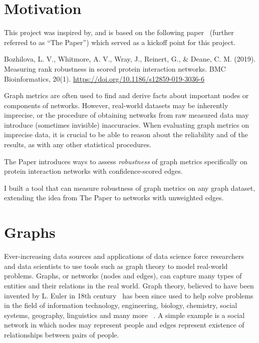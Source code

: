 \section{Motivation}

This project was inspired by, and is based on the following paper~\cite{Bozhilova2019} (further referred to as ``The Paper'') which served as a kickoff point for this project.
\begin{adjustwidth}{1cm}{}
    \vspace*{0.5em}
    Bozhilova, L. V., Whitmore, A. V., Wray, J., Reinert, G., \& Deane, C. M. (2019). Measuring rank robustness in scored protein interaction networks. BMC Bioinformatics, 20(1). \url{https://doi.org/10.1186/s12859-019-3036-6}
    \vspace*{0.5em}
\end{adjustwidth}

Graph metrics are often used to find and derive facts about important nodes or components of networks.
However, real-world datasets may be inherently imprecise, or the procedure of obtaining networks from raw measured data may introduce (sometimes invisible) inaccuracies.
When evaluating graph metrics on imprecise data, it is crucial to be able to reason about the reliability and of the results, as with any other statistical procedures.

The Paper introduces ways to assess \textsl{robustness} of graph metrics specifically on protein interaction networks with confidence-scored edges.

I built a tool that can measure robustness of graph metrics on any graph dataset, extending the idea from The Paper to networks with unweighted edges.

\section{Graphs}

Ever-increasing data sources and applications of data science force researchers and data scientists to use tools such as graph theory to model real-world problems.
Graphs, or networks (nodes and edges), can capture many types of entities and their relations in the real world.
Graph theory, believed to have been invented by L. Euler in 18th century~\cite{BiggsGraphTheory173619361986} has been since used to help solve problems in the field of information technology, engineering, biology, chemistry, social systems, geography, linguistics and many more ~\cite{FouldsGraphTheoryApplications2012}.
A simple example is a social network in which nodes may represent people and edges represent existence of relationships between pairs of people.


